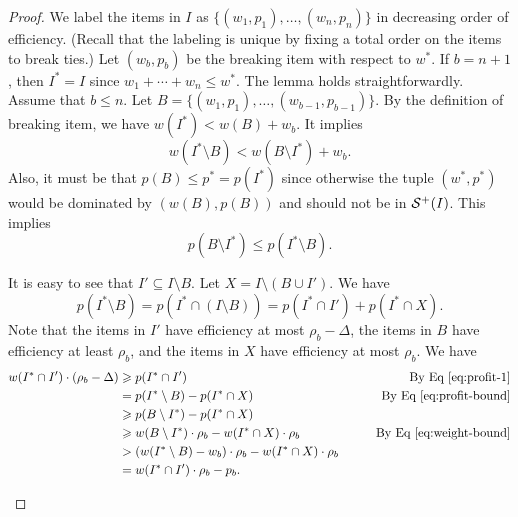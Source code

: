 \documentclass[a4paper,UKenglish,cleveref, autoref, thm-restate, pdfa]{lipics-v2021}
\renewcommand{\leq}{\leqslant}
\renewcommand{\geq}{\geqslant}
\begin{document}
\begin{proof}
    We label the items in $I$ as  $\{(w_1, p_1), \ldots, (w_n, p_n)\}$ in decreasing order of efficiency. (Recall that the labeling is unique by fixing a total order on the items to break ties.)  Let $(w_b, p_b)$ be the breaking item with respect to $w^*$. If $b = n + 1$, then $I^* = I$ since $w_1 + \cdots + w_n \leq w^*$. The lemma holds straightforwardly. Assume that $b \leq n$.  Let $B = \{(w_1, p_1), \ldots, (w_{b-1}, p_{b-1})\}$. By the definition of breaking item, we have $w(I^*) < w(B)+w_{b}$. It implies
    \begin{equation}\label{eq:weight-bound}
        w(I^*\setminus B)   <   w(B\setminus I^*) + w_b.
    \end{equation}
    Also, it must be that $p(B) \leq p^*=p(I^*)$ since otherwise the tuple $(w^*, p^*)$ would be dominated by $(w(B),p(B))$ and should not be in ${\cal S}^+(I)$. This implies
    \begin{equation}\label{eq:profit-bound}
         p(B\setminus I^*) \leq p(I^*\setminus B).
    \end{equation}
    \begin{romanenumerate}
        \item It is easy to see that $I'\subseteq I\setminus B$. Let $X=I\setminus (B\cup I')$.
        We have 
        \begin{equation}
           p(I^*\setminus B) = p(I^* \cap (I\setminus B)) = p(I^*\cap I') + p(I^*\cap X) \label{eq:profit-1}.
        \end{equation}
        Note that the items in $I'$ have efficiency at most $\rho_b - \Delta$, the items in $B$ have efficiency at least $\rho_b$, and the items in $X$ have efficiency at most $\rho_b$.  We have
        \begin{align*}
            w(I^*\cap I')\cdot (\rho_b-\Delta)&\geq p(I^*\cap I') \qquad\qquad\qquad &\text{By Eq~\eqref{eq:profit-1}}\\
            &= p(I^*\setminus B)-p(I^*\cap X)  \qquad\qquad\qquad &\text{By Eq~\eqref{eq:profit-bound}}\\
            &\geq p(B\setminus I^*)-p(I^*\cap X)    \\
            &\geq w(B\setminus I^*)\cdot \rho_b - w(I^*\cap X)\cdot \rho_b &\qquad\text{By Eq~\eqref{eq:weight-bound}}\\
            &> (w(I^*\setminus B)-w_b)\cdot \rho_b - w(I^*\cap X)\cdot \rho_b  \\
            &= w(I^*\cap I')\cdot \rho_b-p_b.
        \end{align*}        

\end{romanenumerate}
\end{proof}
\end{document}
